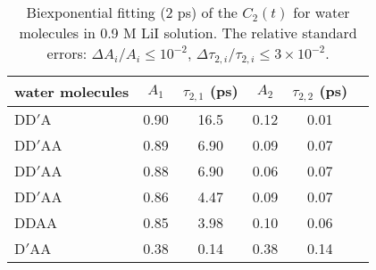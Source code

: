 \begin{table}[H]
\centering
\caption{\label{tab:fitting_c2_for_each_type_of_water}%
	Biexponential fitting (2 ps) of the $C_2(t)$ for water molecules in 0.9 M LiI solution. 
The relative standard errors: $\Delta A_i/A_i \le 10^{-2}$, $\Delta \tau_{2,i}/\tau_{2,i} \le 3\times 10^{-2}$.}
\begin{tabular}{lccccc}
water molecules & $A_1$  & $\tau_{2,1}$ (ps) & $A_2$ & $\tau_{2,2}$ (ps) \\
\hline
DD$'$A & 0.90 & 16.5 & 0.12 & 0.01 \\
DD$'$AA & 0.89 & 6.90 & 0.09 & 0.07 \\
DD$'$AA & 0.88 & 6.90 & 0.06 & 0.07 \\
DD$'$AA & 0.86 & 4.47 & 0.09 & 0.07 \\
DDAA & 0.85 & 3.98 & 0.10 & 0.06 \\
D$'$AA & 0.38 & 0.14 & 0.38 & 0.14 \\
\end{tabular}
\end{table}
%

